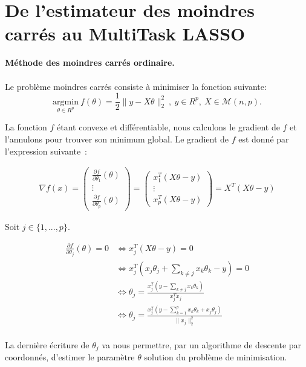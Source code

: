 \documentclass{article}
\begin{document}
\section*{De l'estimateur des moindres carrés au MultiTask LASSO} \vspace{.5cm}

\textbf{Méthode des moindres carrés ordinaire.} \\
\\ Le problème moindres carrés consiste à minimiser la fonction suivante: \\
$$\underset{\theta\in R^p}{\mathrm{argmin}} \ f(\theta)=\frac{1}{2} {\| y - X\theta\|_2^2} \
, \ y \in R^p,\ X \in \mathcal{M}(n,p).
 $$
 
La fonction $f$ étant convexe et différentiable, nous calculons le gradient de $f$ et l'annulons pour trouver son minimum global.
Le gradient de $f$ est donné par l'expression suivante\ :

\begin{align*}
    \nabla f(x) = \begin{pmatrix}
        \frac{\partial f}{\partial \theta_1} (\theta) \\ \vdots \\ \frac{\partial f}{\partial \theta_p} (\theta)
    \end{pmatrix}= \begin{pmatrix}
        x_1^T(X \theta -y) \\ \vdots \\ x_p^T(X \theta -y)
    \end{pmatrix} =X^T(X \theta -y)
\end{align*}

Soit $j \in \{1, ... ,p \}.$
	 
\begin{align*}
    \frac{\partial f}{\partial \theta_j} (\theta) = 0     &\Longleftrightarrow x_j^T(X \theta -y)= 0\\
     &\Longleftrightarrow x_j^T(x_j\theta_j + \sum_{k \ne j} x_k\theta_k - y) = 0\\ &\Longleftrightarrow \theta_j = \frac{x_j^T(y -  \sum_{k \ne j} x_k\theta_k)}{x_j^Tx_j} \\ &\Longleftrightarrow \theta_j = \frac{x_j^T(y -  \sum_{k=1}^{p} x_k\theta_k  + x_j\theta_j)}{\| x_j\|_2^2}
\end{align*} \\

La dernière écriture de $\theta_j$ va nous permettre, par un algorithme de descente par coordonnés, d'estimer le paramètre $\theta$ solution du problème de minimisation. \\
\end{document}
